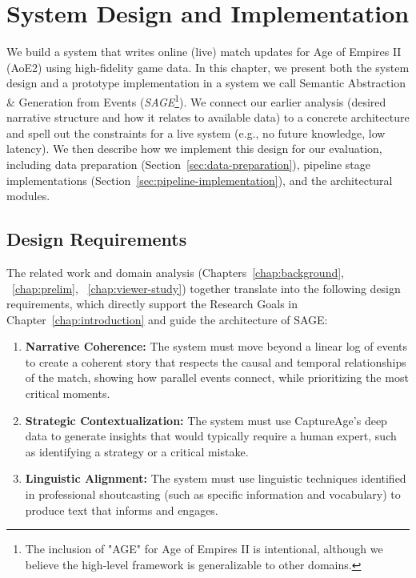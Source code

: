 \chapter{System Design and Implementation}\label{chap:methods}\label{chap:impl}
We build a system that writes online (live) match updates for Age of Empires II (AoE2) using high-fidelity game data. In this chapter, we present both the system design and a prototype implementation in a system we call Semantic Abstraction \& Generation from Events (\textit{SAGE}\footnote{The inclusion of "AGE" for Age of Empires II is intentional, although we believe the high-level framework is generalizable to other domains.}). We connect our earlier analysis (desired narrative structure and how it relates to available data) to a concrete architecture and spell out the constraints for a live system (e.g., no future knowledge, low latency). We then describe how we implement this design for our evaluation, including data preparation (Section~\ref{sec:data-preparation}), pipeline stage implementations (Section~\ref{sec:pipeline-implementation}), and the architectural modules.

\section{Design Requirements}
The related work and domain analysis (Chapters~\ref{chap:background}, ~\ref{chap:prelim}, ~\ref{chap:viewer-study}) together translate into the following design requirements, which directly support the Research Goals in Chapter~\ref{chap:introduction} and guide the architecture of SAGE:

\begin{enumerate}
  \item \textbf{Narrative Coherence:} The system must move beyond a linear log of events to create a coherent story that respects the causal and temporal relationships of the match, showing how parallel events connect, while prioritizing the most critical moments.
  \item \textbf{Strategic Contextualization:} The system must use CaptureAge's deep data to generate insights that would typically require a human expert, such as identifying a strategy or a critical mistake.
  \item \textbf{Linguistic Alignment:} The system must use linguistic techniques identified in professional shoutcasting (such as specific information and vocabulary) to produce text that informs and engages.
\end{enumerate}

